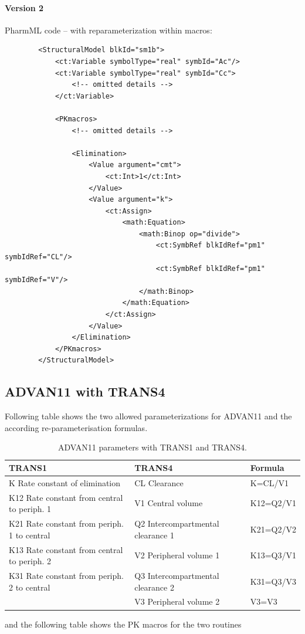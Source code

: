 \paragraph{Version 2}
PharmML code -- with reparameterization within macros:
\lstset{language=XML}
\begin{lstlisting}
        <StructuralModel blkId="sm1b">
            <ct:Variable symbolType="real" symbId="Ac"/>
            <ct:Variable symbolType="real" symbId="Cc">
                <!-- omitted details -->
            </ct:Variable>
            
            <PKmacros>
                <!-- omitted details -->
                
                <Elimination>
                    <Value argument="cmt">
                        <ct:Int>1</ct:Int>
                    </Value>
                    <Value argument="k">
                        <ct:Assign>
                            <math:Equation>
                                <math:Binop op="divide">
                                    <ct:SymbRef blkIdRef="pm1" symbIdRef="CL"/>
                                    <ct:SymbRef blkIdRef="pm1" symbIdRef="V"/>
                                </math:Binop>
                            </math:Equation>
                        </ct:Assign>
                    </Value>
                </Elimination>
            </PKmacros>
        </StructuralModel>
\end{lstlisting}


\subsection{ADVAN11 with TRANS4}
Following table shows the two allowed parameterizations for ADVAN11 and the according 
re-parameterisation formulas. 
\begin{table}[ht]
\begin{center}
\begin{tabular*}{.95\textwidth}{@{\extracolsep{\fill} } lll}
  \hline
  \hline
  TRANS1								& TRANS4						& Formula \\
  \hline
K Rate constant of elimination				& CL Clearance 					& K=CL/V1 \\
K12 Rate constant from central to periph. 1	& V1 Central volume  				& K12=Q2/V1 \\
K21 Rate constant from periph. 1 to central	& Q2 Intercompartmental clearance 1  	& K21=Q2/V2 \\
K13 Rate constant from central to periph. 2	& V2 Peripheral volume 1  			& K13=Q3/V1 \\
K31 Rate constant from periph. 2 to central	& Q3 Intercompartmental clearance 2  	& K31=Q3/V3 \\
									& V3 Peripheral volume 2  			& V3=V3 \\
\end{tabular*}
\caption{ADVAN11 parameters with TRANS1 and TRANS4.}
\end{center}
\end{table}
and the following table shows the PK macros for the two routines

